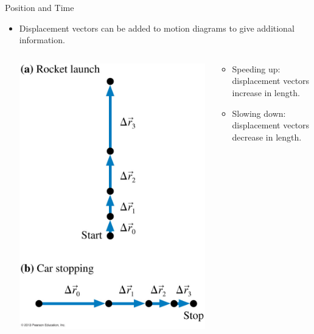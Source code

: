 \documentclass{beamer}
\begin{document}
\begin{frame}{Position and Time}
\begin{itemize}
   \item Displacement vectors can be added to motion diagrams to give additional information.
\begin{columns}
   \begin{column}{0.4\textwidth}
   \begin{center}
      \includegraphics[width=\textwidth]{../figures/01_10_Figure.jpg}
   \end{center}
   \end{column}
   \begin{column}{0.6\textwidth}
      \begin{itemize}
         \item Speeding up: displacement vectors increase in length.
         \item Slowing down: displacement vectors decrease in length.
      \end{itemize}
   \end{column}
\end{columns}
\end{itemize}
\end{frame}
\end{document}
